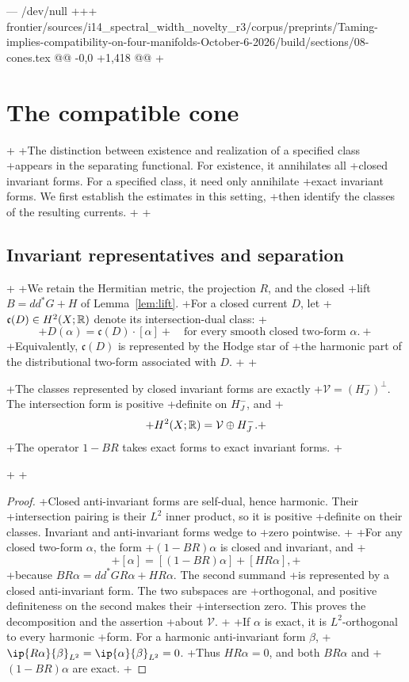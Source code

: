 --- /dev/null
+++ frontier/sources/i14_spectral_width_novelty_r3/corpus/preprints/Taming-implies-compatibility-on-four-manifolds-October-6-2026/build/sections/08-cones.tex
@@ -0,0 +1,418 @@
+\section{The compatible cone}\label{sec:cones}
+
+The distinction between existence and realization of a specified class
+appears in the separating functional. For existence, it annihilates all
+closed invariant forms. For a specified class, it need only annihilate
+exact invariant forms. We first establish the estimates in this setting,
+then identify the classes of the resulting currents.
+
+\subsection{Invariant representatives and separation}
+
+We retain the Hermitian metric, the projection \(R\), and the closed
+lift \(B=dd^*G+H\) of Lemma~\ref{lem:lift}.
+For a closed current \(D\), let
+\(\mathfrak c(D)\in H^2(X;\mathbb R)\) denote its intersection-dual class:
+\[
+ D(\alpha)=\mathfrak c(D)\cdot[\alpha]
+ \quad\text{for every smooth closed two-form }\alpha.
+\]
+Equivalently, \(\mathfrak c(D)\) is represented by the Hodge star of
+the harmonic part of the distributional two-form associated with \(D\).
+
+\begin{lemma}\label{lem:invariant-cohomology}
+The classes represented by closed invariant forms are exactly
+\(\mathcal V=(H_J^-)^\perp\). The intersection form is positive
+definite on \(H_J^-\), and
+\[
+ H^2(X;\mathbb R)=\mathcal V\oplus H_J^-.
+\]
+The operator \(1-BR\) takes exact forms to exact invariant forms.
+\end{lemma}
+
+\begin{proof}
+Closed anti-invariant forms are self-dual, hence harmonic. Their
+intersection pairing is their \(L^2\) inner product, so it is positive
+definite on their classes. Invariant and anti-invariant forms wedge to
+zero pointwise.
+
+For any closed two-form \(\alpha\), the form
+\((1-BR)\alpha\) is closed and invariant, and
+\[
+ [\alpha]=[(1-BR)\alpha]+[HR\alpha],
+\]
+because \(BR\alpha=dd^*GR\alpha+HR\alpha\). The second summand
+is represented by a closed anti-invariant form. The two subspaces are
+orthogonal, and positive definiteness on the second makes their
+intersection zero. This proves the decomposition and the assertion
+about \(\mathcal V\).
+
+If \(\alpha\) is exact, it is \(L^2\)-orthogonal to every harmonic
+form. For a harmonic anti-invariant form \(\beta\),
+\(\ip{R\alpha}{\beta}_{L^2}=\ip{\alpha}{\beta}_{L^2}=0\).
+Thus \(HR\alpha=0\), and both \(BR\alpha\) and
+\((1-BR)\alpha\) are exact.
+\end{proof}
